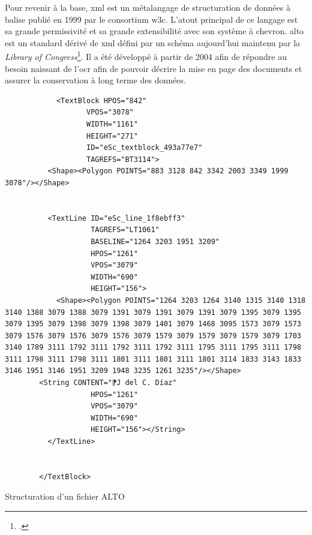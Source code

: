 	Pour revenir à la base, \gls{xml} est un métalangage de structuration de données à balise publié en 1999 par le consortium \gls{w3c}. L'atout principal de ce langage est sa grande permissivité et sa grande extensibilité avec son système à chevron. \gls{alto} est un standard dérivé de \gls{xml} défini par un schéma aujourd'hui maintenu par la \textit{Library of Congress}\footcite[p.~74]{caronFormatsDonneesPour2021}. Il a été développé à partir de 2004 afin de répondre au besoin naissant de l'\gls{ocr} afin de pouvoir décrire la mise en page des documents et assurer la conservation à long terme des données. \newpar
	
	\begin{listing}
	        \begin{verbatim}
	        <TextBlock HPOS="842"
                   VPOS="3078"
                   WIDTH="1161"
                   HEIGHT="271"
                   ID="eSc_textblock_493a77e7"
                   TAGREFS="BT3114">
          <Shape><Polygon POINTS="883 3128 842 3342 2003 3349 1999 3078"/></Shape>
          
          
          <TextLine ID="eSc_line_1f8ebff3"
                    TAGREFS="LT1061"
                    BASELINE="1264 3203 1951 3209" 
                    HPOS="1261"
                    VPOS="3079"
                    WIDTH="690"
                    HEIGHT="156">
            <Shape><Polygon POINTS="1264 3203 1264 3140 1315 3140 1318 3140 1388 3079 1388 3079 1391 3079 1391 3079 1391 3079 1395 3079 1395 3079 1395 3079 1398 3079 1398 3079 1401 3079 1468 3095 1573 3079 1573 3079 1576 3079 1576 3079 1576 3079 1579 3079 1579 3079 1579 3079 1703 3140 1789 3111 1792 3111 1792 3111 1792 3111 1795 3111 1795 3111 1798 3111 1798 3111 1798 3111 1801 3111 1801 3111 1801 3114 1833 3143 1833 3146 1951 3146 1951 3209 1948 3235 1261 3235"/></Shape>
	    <String CONTENT="⁋J del C. Díaz"
                    HPOS="1261"
                    VPOS="3079"
                    WIDTH="690"
                    HEIGHT="156"></String>
          </TextLine>

          
        </TextBlock>
            \end{verbatim}
        	\caption{Structuration d'un fichier ALTO}
        	\label{code:alto_struct}
    \end{listing}
    
